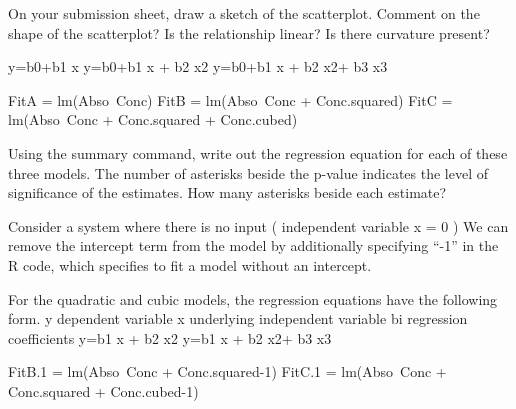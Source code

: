 On your submission sheet, draw a sketch of the scatterplot. Comment on the shape of the scatterplot? Is the relationship linear? Is there curvature present?

y=b0+b1 x 
y=b0+b1 x + b2 x2
y=b0+b1 x + b2 x2+ b3 x3


FitA = lm(Abso~Conc)
FitB = lm(Abso~Conc + Conc.squared)
FitC = lm(Abso~Conc + Conc.squared + Conc.cubed)



Using the summary command, write out the regression equation for each of these three models.
The number of asterisks beside the p-value indicates the level of significance of the estimates. How many asterisks beside each estimate?

Consider a system where there is no input ( independent variable x = 0 )  
We can remove the intercept term from the model by additionally specifying “-1” in the R code, which specifies to fit a model without an intercept. 


For the quadratic and cubic models, the regression equations have the following form.
y dependent variable
x underlying independent variable  
bi regression coefficients 
y=b1 x + b2 x2
y=b1 x + b2 x2+ b3 x3

FitB.1 = lm(Abso~Conc + Conc.squared-1)
FitC.1 = lm(Abso~Conc + Conc.squared + Conc.cubed-1)










